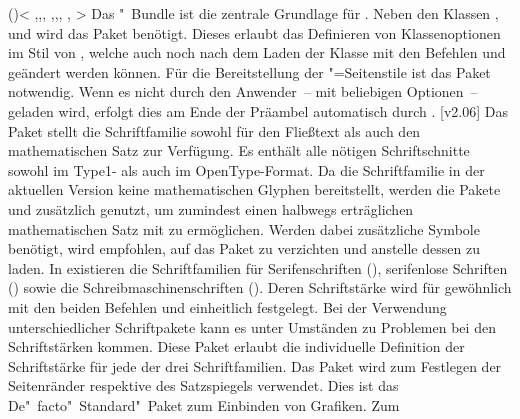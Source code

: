 \begin{DeclarePackages}
\itempkg{}()<%
    ,,,
    ,,,
    ,
>%
  Das \KOMAScript"~Bundle ist die zentrale Grundlage für \TUDScript. Neben den 
  Klassen ,  und  wird das Paket 
   benötigt. Dieses erlaubt das Definieren von Klassenoptionen 
  im Stil von \KOMAScript, welche auch noch nach dem Laden der Klasse mit den 
  Befehlen  und  geändert werden können. Für 
  die Bereitstellung der "=Seitenstile ist das Paket 
   notwendig. Wenn es nicht durch den Anwender~-- mit 
  beliebigen Optionen~-- geladen wird, erfolgt dies am Ende der Präambel 
  automatisch durch \TUDScript.
[v2.06]
  Das Paket  stellt die Schriftfamilie \OpenSans sowohl für 
  den Fließtext als auch den mathematischen Satz zur Verfügung. Es enthält alle 
  nötigen Schriftschnitte sowohl im Type1- als auch im OpenType-Format. Da die 
  Schriftfamilie in der aktuellen Version keine mathematischen Glyphen 
  bereitstellt, werden die Pakete  und  
  zusätzlich genutzt, um zumindest einen halbwegs erträglichen mathematischen 
  Satz mit \OpenSans zu ermöglichen. Werden dabei zusätzliche Symbole benötigt, 
  wird empfohlen, auf das Paket  zu verzichten und anstelle 
  dessen  zu laden.
  In  existieren die Schriftfamilien für Serifenschriften 
  (), serifenlose Schriften () sowie die 
  Schreibmaschinenschriften (). Deren Schriftstärke wird für 
  gewöhnlich mit den beiden Befehlen  und  
  einheitlich festgelegt. Bei der Verwendung unterschiedlicher Schriftpakete 
  kann es unter Umständen zu Problemen bei den Schriftstärken kommen. Diese 
  Paket erlaubt die individuelle Definition der Schriftstärke für jede der drei 
  Schriftfamilien.
  Das Paket wird zum Festlegen der Seitenränder respektive des Satzspiegels 
  verwendet.
  Dies ist das De"~facto"~Standard"~Paket zum Einbinden von Grafiken. Zum 

\end{DeclarePackages}
